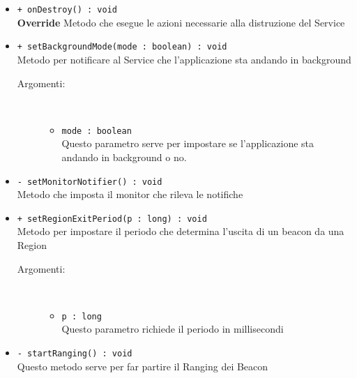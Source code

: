 \documentclass[../DefinizioneDiProdotto.tex]{subfiles}
\begin{document}
\begin{description}
\begin{itemize}
		\item \texttt{+ onDestroy() : void}\\
		\textbf{Override} Metodo che esegue le azioni necessarie alla distruzione del Service
		\item \texttt{+ setBackgroundMode(mode : boolean) : void}\\
		Metodo per notificare al Service che l'applicazione sta andando in background 
		\begin{description}
			\item[Argomenti:] \
			\begin{itemize}
				\item \texttt{mode : boolean}\\
				Questo parametro serve per impostare se l'applicazione sta andando in background o no.\end{itemize}
		\end{description}
		\item \texttt{- setMonitorNotifier() : void}\\
		Metodo che imposta il monitor che rileva le notifiche
		\item \texttt{+ setRegionExitPeriod(p : long) : void}\\
		Metodo per impostare il periodo che determina l'uscita di un beacon da una Region
		\begin{description}
			\item[Argomenti:] \
			\begin{itemize}
				\item \texttt{p : long}\\
				Questo parametro richiede il periodo in millisecondi \end{itemize}
		\end{description}
		\item \texttt{- startRanging() : void}\\
		Questo metodo serve per far partire il Ranging dei Beacon 
	\end{itemize}
\end{description}
\end{document}
